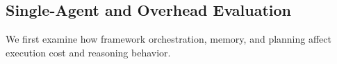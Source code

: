 


\subsection{Single-Agent and Overhead Evaluation}

We first examine how framework orchestration, memory, and planning affect execution cost and reasoning behavior.















% 
